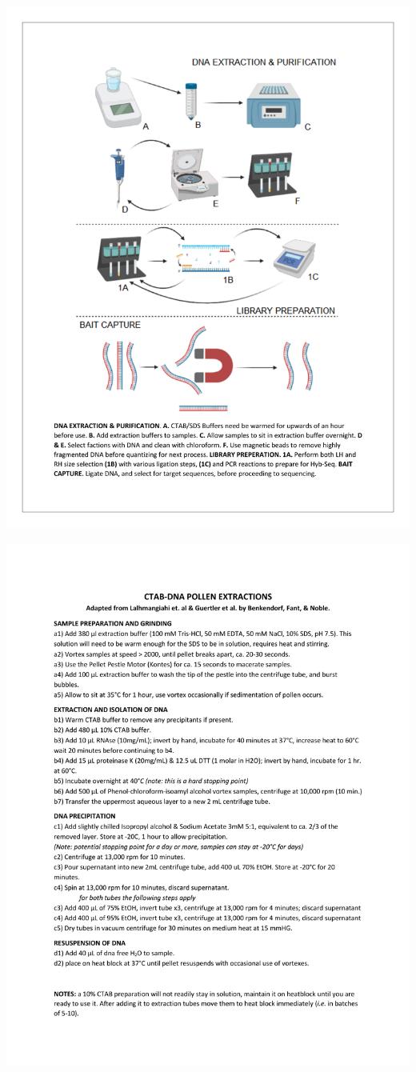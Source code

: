 \documentclass[
]{article}
\begin{document}
\newpage

\includegraphics{../graphics/assorted/molecular_workflow.pdf}

\newpage

\includegraphics{../graphics/assorted/pollen_ctab.pdf}
\end{document}
